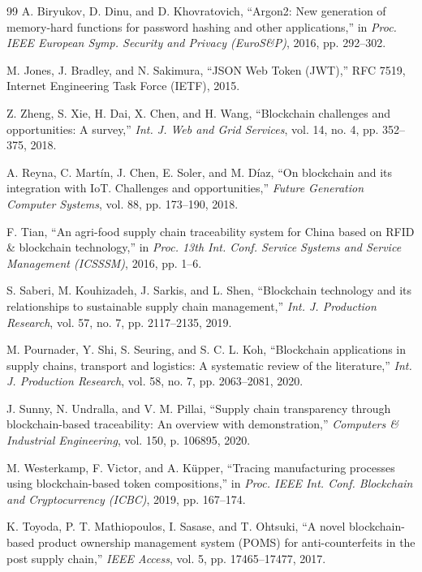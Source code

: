 \documentclass[12pt,a4paper]{report}
\begin{document}
\begin{thebibliography}{99}
 A. Biryukov, D. Dinu, and D. Khovratovich, ``Argon2: New generation of memory-hard functions for password hashing and other applications,'' in \textit{Proc. IEEE European Symp. Security and Privacy (EuroS\&P)}, 2016, pp. 292--302.

 M. Jones, J. Bradley, and N. Sakimura, ``JSON Web Token (JWT),'' RFC 7519, Internet Engineering Task Force (IETF), 2015.

 Z. Zheng, S. Xie, H. Dai, X. Chen, and H. Wang, ``Blockchain challenges and opportunities: A survey,'' \textit{Int. J. Web and Grid Services}, vol. 14, no. 4, pp. 352--375, 2018.

 A. Reyna, C. Martín, J. Chen, E. Soler, and M. Díaz, ``On blockchain and its integration with IoT. Challenges and opportunities,'' \textit{Future Generation Computer Systems}, vol. 88, pp. 173--190, 2018.

 F. Tian, ``An agri-food supply chain traceability system for China based on RFID \& blockchain technology,'' in \textit{Proc. 13th Int. Conf. Service Systems and Service Management (ICSSSM)}, 2016, pp. 1--6.

 S. Saberi, M. Kouhizadeh, J. Sarkis, and L. Shen, ``Blockchain technology and its relationships to sustainable supply chain management,'' \textit{Int. J. Production Research}, vol. 57, no. 7, pp. 2117--2135, 2019.

 M. Pournader, Y. Shi, S. Seuring, and S. C. L. Koh, ``Blockchain applications in supply chains, transport and logistics: A systematic review of the literature,'' \textit{Int. J. Production Research}, vol. 58, no. 7, pp. 2063--2081, 2020.

 J. Sunny, N. Undralla, and V. M. Pillai, ``Supply chain transparency through blockchain-based traceability: An overview with demonstration,'' \textit{Computers \& Industrial Engineering}, vol. 150, p. 106895, 2020.

 M. Westerkamp, F. Victor, and A. Küpper, ``Tracing manufacturing processes using blockchain-based token compositions,'' in \textit{Proc. IEEE Int. Conf. Blockchain and Cryptocurrency (ICBC)}, 2019, pp. 167--174.

 K. Toyoda, P. T. Mathiopoulos, I. Sasase, and T. Ohtsuki, ``A novel blockchain-based product ownership management system (POMS) for anti-counterfeits in the post supply chain,'' \textit{IEEE Access}, vol. 5, pp. 17465--17477, 2017.


\end{thebibliography}
\end{document}

